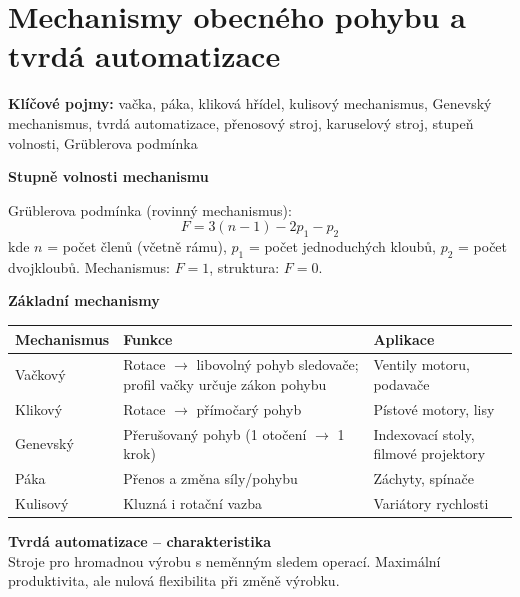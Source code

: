 \documentclass[a4paper,10pt]{article}
\begin{document}
\section{Mechanismy obecného pohybu a tvrdá automatizace}

\begin{pojmybox}
\textbf{Klíčové pojmy:}
vačka, páka, kliková hřídel, kulisový mechanismus, Genevský mechanismus,
tvrdá automatizace, přenosový stroj, karuselový stroj, stupeň volnosti,
Grüblerova podmínka
\end{pojmybox}

\begin{vysvetlenibox}
\textbf{Stupně volnosti mechanismu}

\begin{vzorcebox}
Grüblerova podmínka (rovinný mechanismus):
$$F = 3(n-1) - 2p_1 - p_2$$
kde $n$ = počet členů (včetně rámu), $p_1$ = počet jednoduchých kloubů,
$p_2$ = počet dvojkloubů. Mechanismus: $F=1$, struktura: $F=0$.
\end{vzorcebox}

\textbf{Základní mechanismy}

\begin{center}
\begin{tabularx}{0.95\linewidth}{@{} l X l @{}}
    \toprule
    \textbf{Mechanismus} & \textbf{Funkce} & \textbf{Aplikace} \\
    \midrule
    Vačkový      & Rotace $\to$ libovolný pohyb sledovače;
                   profil vačky určuje zákon pohybu & Ventily motoru, podavače \\
    Klikový       & Rotace $\to$ přímočarý pohyb & Pístové motory, lisy \\
    Genevský      & Přerušovaný pohyb (1 otočení $\to$ 1 krok)
                  & Indexovací stoly, filmové projektory \\
    Páka          & Přenos a změna síly/pohybu & Záchyty, spínače \\
    Kulisový      & Kluzná i rotační vazba & Variátory rychlosti \\
    \bottomrule
\end{tabularx}
\end{center}

\textbf{Tvrdá automatizace -- charakteristika}\\
Stroje pro hromadnou výrobu s neměnným sledem operací.
Maximální produktivita, ale nulová flexibilita při změně výrobku.


\end{vysvetlenibox}
\end{document}
